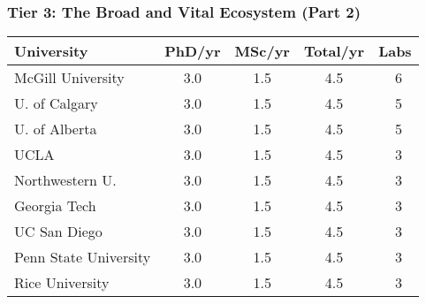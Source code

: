 \documentclass[aspectratio=169]{beamer}
\newcommand{\tabletext}{\normalsize}
\begin{document}
\begin{frame}
    \frametitle{Tier 3: The Broad and Vital Ecosystem (Part 2)}
    \subtitle{Medium producers with 4-6 total theses per year}
    
    \begin{table}
        \centering
        \tabletext
        \begin{tabularx}{\textwidth}{
            l
            S[table-format=1.1]
            S[table-format=1.1]
            S[table-format=1.1]
            S[table-format=2.0, table-space-text-pre=~]
        }
            \toprule
            \textbf{University} & {\textbf{PhD/yr}} & {\textbf{MSc/yr}} & {\textbf{Total/yr}} & {\textbf{Labs}} \\
            \midrule
            McGill University & 3.0 & 1.5 & 4.5 & ~6 \\
            U. of Calgary & 3.0 & 1.5 & 4.5 & ~5 \\
            U. of Alberta & 3.0 & 1.5 & 4.5 & ~5 \\
            UCLA & 3.0 & 1.5 & 4.5 & ~3 \\
            Northwestern U. & 3.0 & 1.5 & 4.5 & ~3 \\
            Georgia Tech & 3.0 & 1.5 & 4.5 & ~3 \\
            UC San Diego & 3.0 & 1.5 & 4.5 & ~3 \\
            Penn State University & 3.0 & 1.5 & 4.5 & ~3 \\
            Rice University & 3.0 & 1.5 & 4.5 & ~3 \\
            \bottomrule
        \end{tabularx}
    \end{table}
\end{frame}
\end{document}
